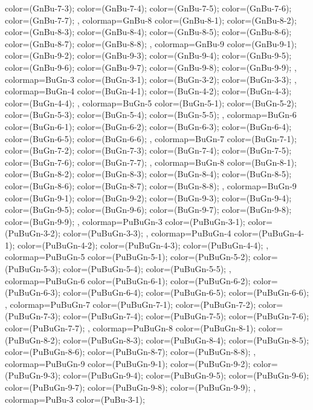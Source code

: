 {{  color=(GnBu-7-3);
  color=(GnBu-7-4);
  color=(GnBu-7-5);
  color=(GnBu-7-6);
  color=(GnBu-7-7);
},
colormap={GnBu-8}{
  color=(GnBu-8-1);
  color=(GnBu-8-2);
  color=(GnBu-8-3);
  color=(GnBu-8-4);
  color=(GnBu-8-5);
  color=(GnBu-8-6);
  color=(GnBu-8-7);
  color=(GnBu-8-8);
},
colormap={GnBu-9}{
  color=(GnBu-9-1);
  color=(GnBu-9-2);
  color=(GnBu-9-3);
  color=(GnBu-9-4);
  color=(GnBu-9-5);
  color=(GnBu-9-6);
  color=(GnBu-9-7);
  color=(GnBu-9-8);
  color=(GnBu-9-9);
},
colormap={BuGn-3}{
  color=(BuGn-3-1);
  color=(BuGn-3-2);
  color=(BuGn-3-3);
},
colormap={BuGn-4}{
  color=(BuGn-4-1);
  color=(BuGn-4-2);
  color=(BuGn-4-3);
  color=(BuGn-4-4);
},
colormap={BuGn-5}{
  color=(BuGn-5-1);
  color=(BuGn-5-2);
  color=(BuGn-5-3);
  color=(BuGn-5-4);
  color=(BuGn-5-5);
},
colormap={BuGn-6}{
  color=(BuGn-6-1);
  color=(BuGn-6-2);
  color=(BuGn-6-3);
  color=(BuGn-6-4);
  color=(BuGn-6-5);
  color=(BuGn-6-6);
},
colormap={BuGn-7}{
  color=(BuGn-7-1);
  color=(BuGn-7-2);
  color=(BuGn-7-3);
  color=(BuGn-7-4);
  color=(BuGn-7-5);
  color=(BuGn-7-6);
  color=(BuGn-7-7);
},
colormap={BuGn-8}{
  color=(BuGn-8-1);
  color=(BuGn-8-2);
  color=(BuGn-8-3);
  color=(BuGn-8-4);
  color=(BuGn-8-5);
  color=(BuGn-8-6);
  color=(BuGn-8-7);
  color=(BuGn-8-8);
},
colormap={BuGn-9}{
  color=(BuGn-9-1);
  color=(BuGn-9-2);
  color=(BuGn-9-3);
  color=(BuGn-9-4);
  color=(BuGn-9-5);
  color=(BuGn-9-6);
  color=(BuGn-9-7);
  color=(BuGn-9-8);
  color=(BuGn-9-9);
},
colormap={PuBuGn-3}{
  color=(PuBuGn-3-1);
  color=(PuBuGn-3-2);
  color=(PuBuGn-3-3);
},
colormap={PuBuGn-4}{
  color=(PuBuGn-4-1);
  color=(PuBuGn-4-2);
  color=(PuBuGn-4-3);
  color=(PuBuGn-4-4);
},
colormap={PuBuGn-5}{
  color=(PuBuGn-5-1);
  color=(PuBuGn-5-2);
  color=(PuBuGn-5-3);
  color=(PuBuGn-5-4);
  color=(PuBuGn-5-5);
},
colormap={PuBuGn-6}{
  color=(PuBuGn-6-1);
  color=(PuBuGn-6-2);
  color=(PuBuGn-6-3);
  color=(PuBuGn-6-4);
  color=(PuBuGn-6-5);
  color=(PuBuGn-6-6);
},
colormap={PuBuGn-7}{
  color=(PuBuGn-7-1);
  color=(PuBuGn-7-2);
  color=(PuBuGn-7-3);
  color=(PuBuGn-7-4);
  color=(PuBuGn-7-5);
  color=(PuBuGn-7-6);
  color=(PuBuGn-7-7);
},
colormap={PuBuGn-8}{
  color=(PuBuGn-8-1);
  color=(PuBuGn-8-2);
  color=(PuBuGn-8-3);
  color=(PuBuGn-8-4);
  color=(PuBuGn-8-5);
  color=(PuBuGn-8-6);
  color=(PuBuGn-8-7);
  color=(PuBuGn-8-8);
},
colormap={PuBuGn-9}{
  color=(PuBuGn-9-1);
  color=(PuBuGn-9-2);
  color=(PuBuGn-9-3);
  color=(PuBuGn-9-4);
  color=(PuBuGn-9-5);
  color=(PuBuGn-9-6);
  color=(PuBuGn-9-7);
  color=(PuBuGn-9-8);
  color=(PuBuGn-9-9);
},
colormap={PuBu-3}{
  color=(PuBu-3-1);
}}
